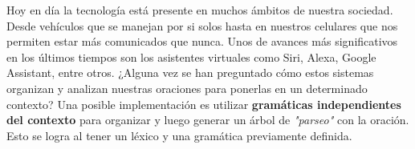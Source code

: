 Hoy en día la tecnología está presente en muchos ámbitos de nuestra sociedad. Desde vehículos que se manejan por si solos hasta en nuestros celulares que nos permiten estar más comunicados que nunca. Unos de avances más significativos en los últimos tiempos son los asistentes virtuales como Siri, Alexa, Google Assistant, entre otros. ¿Alguna vez se han preguntado cómo estos sistemas organizan y analizan nuestras oraciones para ponerlas en un determinado contexto? Una posible implementación es utilizar \textbf{gramáticas independientes del contexto} para organizar y luego generar un árbol de \textit{"parseo"} con la oración. Esto se logra al tener un léxico y una gramática previamente definida.